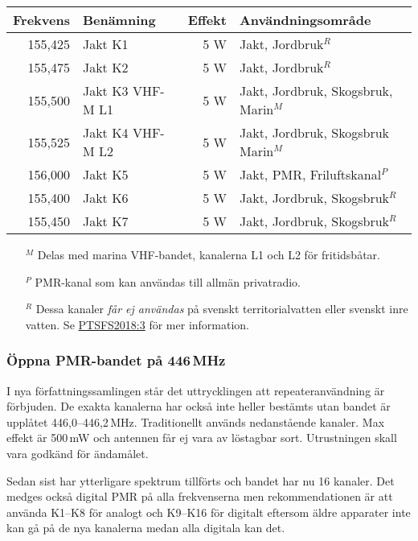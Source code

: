 \begin{tabular}{rlrl}
	\textbf{Frekvens} & \textbf{Benämning} & \textbf{Effekt} & \textbf{Användningsområde}            \\ \hline
	          155,425 & Jakt K1            &             5 W & Jakt, Jordbruk$^R$                    \\
	          155,475 & Jakt K2            &             5 W & Jakt, Jordbruk$^R$                    \\
	          155,500 & Jakt K3 VHF-M L1   &             5 W & Jakt, Jordbruk, Skogsbruk, Marin$^M$ \\
	          155,525 & Jakt K4 VHF-M L2   &             5 W & Jakt, Jordbruk, Skogsbruk Marin$^M$  \\
	          156,000 & Jakt K5            &             5 W & Jakt, PMR, Friluftskanal$^P$          \\
	          155,400 & Jakt K6            &             5 W & Jakt, Jordbruk, Skogsbruk$^R$         \\
	          155,450 & Jakt K7           &             5 W & Jakt, Jordbruk, Skogsbruk$^R$
\end{tabular}

\footnotesize
\begin{itemize}
	\item[$^M$] Delas med marina VHF-bandet, kanalerna L1 och L2 för fritidsbåtar.
	\item[$^P$] PMR-kanal som kan användas till allmän privatradio.
	\item[$^R$] Dessa kanaler \textit{får ej användas} på svenskt territorialvatten eller svenskt inre vatten. Se \href{https://pts.se/globalassets/startpage/dokument/legala-dokument/foreskrifter/radio/beslutade_ptsfs-2018-3-undantagsforeskrifter.pdf}{PTSFS2018:3} för mer information.
\end{itemize}
\normalsize

\subsubsection{Öppna PMR-bandet på 446\,MHz}

I nya författningssamlingen står det uttrycklingen att repeateranvändning är förbjuden. De exakta kanalerna har också inte heller bestämts utan bandet är upplåtet 446,0--446,2\,MHz. Traditionellt används nedanstående kanaler. Max effekt är 500\,mW och antennen får ej vara av löstagbar sort. Utrustningen skall vara godkänd för ändamålet.

Sedan sist har ytterligare spektrum tillförts och bandet har nu 16 kanaler. Det medges också digital PMR på alla frekvenserna men rekommendationen är att använda K1--K8 för analogt och K9--K16 för digitalt eftersom äldre apparater inte kan gå på de nya kanalerna medan alla digitala kan det.

